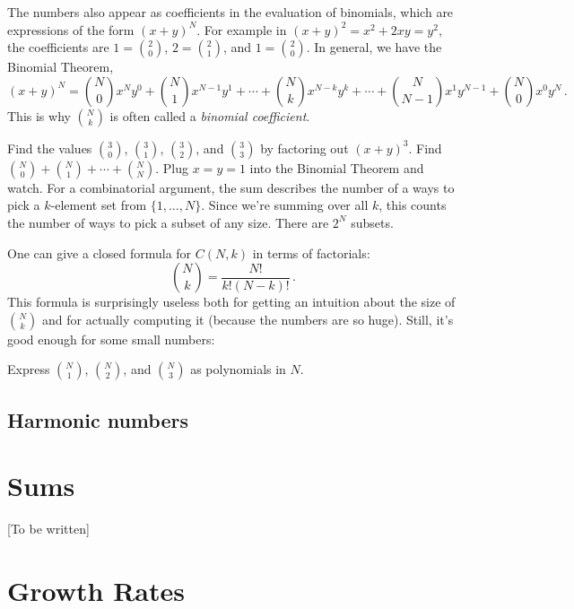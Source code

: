 \documentclass{tufte-handout}
\begin{document}
The numbers also appear as coefficients in the evaluation of
binomials, which are expressions of the form $(x+y)^N$. For example
in $(x+y)^2= x^2 + 2xy = y^2$, the coefficients are $1=\binom{2}{0}$, $2=\binom{2}{1}$, and
$1=\binom{2}{0}$. In general, we have the Binomial Theorem,
\[ (x+y)^N = \binom{N}{0} x^N y^0 +\binom{N}{1} x^{N-1}y^1+\cdots
+ \binom{N}{k} x^{N-k}y^k +\cdots+ \binom{N}{N-1} x^1y^{N-1} +
\binom{N}{0} x^0y^N\,.\] 
This is why $\binom{N}{k}$ is often called a \emph{binomial coefficient}.

\begin{ExerciseList}
  \Exercise Find the values $\binom{3}{0}$, $\binom{3}{1}$,
  $\binom{3}{2}$, and $\binom{3}{3}$ by factoring out $(x+y)^3$.
  \Exercise Find $\binom{N}{0}+\binom{N}{1}+\cdots+\binom{N}{N}$.
  \Answer Plug $x=y=1$ into the Binomial Theorem and watch. For a
  combinatorial argument, the sum describes the number of a ways to
  pick a $k$-element set from $\{1,\ldots, N\}$. Since we're summing
  over all $k$, this counts the number of ways to pick a subset of any
  size. There are $2^N$ subsets.
\end{ExerciseList}

One can give a closed formula for $C(N,k)$ in terms of factorials:
\[ \binom{N}{k}= \frac{N!}{k!(N-k)!}\,. \] 
This formula is surprisingly
useless both for getting an intuition about the size of $\binom{N}{k}$ and
for actually computing it (because the numbers are so huge).
Still, it's good enough for some small numbers:

\begin{ExerciseList}
  \Exercise Express $\binom{N}{1}$, $\binom{N}{2}$, and
  $\binom{N}{3}$ as polynomials in $N$.
\end{ExerciseList}

\subsection{Harmonic numbers}

\section{Sums}

[To be written]

\section{Growth Rates}
\end{document}

